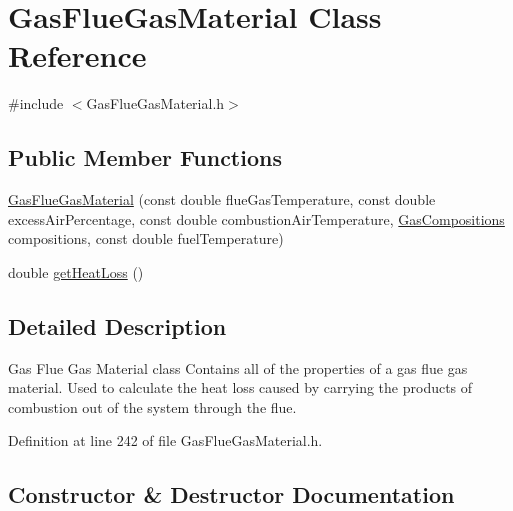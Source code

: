 \hypertarget{class_gas_flue_gas_material}{}\section{Gas\+Flue\+Gas\+Material Class Reference}
\label{class_gas_flue_gas_material}


{\ttfamily \#include $<$Gas\+Flue\+Gas\+Material.\+h$>$}

\subsection*{Public Member Functions}
\begin{DoxyCompactItemize}
\item 
\hyperlink{class_gas_flue_gas_material_aca4ce48fe0feea4e6032679652f38c98}{Gas\+Flue\+Gas\+Material} (const double flue\+Gas\+Temperature, const double excess\+Air\+Percentage, const double combustion\+Air\+Temperature, \hyperlink{class_gas_compositions}{Gas\+Compositions} compositions, const double fuel\+Temperature)
\item 
double \hyperlink{class_gas_flue_gas_material_ad9990d400536c6e8c7c53b9212de400b}{get\+Heat\+Loss} ()
\end{DoxyCompactItemize}


\subsection{Detailed Description}
Gas Flue Gas Material class Contains all of the properties of a gas flue gas material. Used to calculate the heat loss caused by carrying the products of combustion out of the system through the flue. 

Definition at line 242 of file Gas\+Flue\+Gas\+Material.\+h.



\subsection{Constructor \& Destructor Documentation}
\mbox{\label{class_gas_flue_gas_material_aca4ce48fe0feea4e6032679652f38c98}} 
